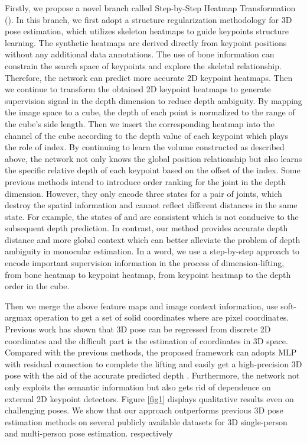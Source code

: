 \documentclass[letterpaper]{article} \usepackage{aaai21}  \usepackage{times}  \usepackage{helvet} \usepackage{courier}  \usepackage[hyphens]{url}  \usepackage{graphicx} \urlstyle{rm} \def\UrlFont{\rm}  \usepackage{natbib}  \usepackage{caption} \frenchspacing  \setlength{\pdfpagewidth}{8.5in}  \setlength{\pdfpageheight}{11in}
\begin{document}
Firstly, we propose a novel branch called Step-by-Step Heatmap Transformation (). In this branch, we first adopt a structure regularization methodology for 3D pose estimation, which utilizes skeleton heatmaps to guide keypoints structure learning. The synthetic heatmaps are derived directly from keypoint positions without any additional data annotations. The use of bone information can constrain the search space of keypoints and explore the skeletal relationship. Therefore, the network can predict more accurate 2D keypoint heatmaps. Then we continue to transform the obtained 2D keypoint heatmaps to generate supervision signal in the depth dimension to reduce depth ambiguity. By mapping the image space to a cube, the depth of each point is normalized to the range of the cube's side length. Then we insert the corresponding heatmap into the channel of the cube according to the depth value of each keypoint which plays the role of index. By continuing to learn the volume constructed as described above, the network not only knows the global position relationship but also learns the specific relative depth of each keypoint based on the offset of the index. Some previous methods intend to introduce order ranking for the joint in the depth dimension. However, they only encode three states  for a pair of joints, which destroy the spatial information and cannot reflect different distances in the same state. For example, the states of  and  are consistent which is not conducive to the subsequent depth prediction. In contrast, our method provides accurate depth distance and more global context which can better alleviate the problem of depth ambiguity in monocular estimation. In a word, we use a step-by-step approach to encode important supervision information in the process of dimension-lifting, from bone heatmap to keypoint heatmap, from keypoint heatmap to the depth order in the cube. 

Then we merge the above feature maps and image context information, use soft-argmax operation to get a set of solid  coordinates where  are pixel coordinates. Previous work has shown that 3D pose can be regressed from discrete 2D coordinates and the difficult part is the estimation of  coordinates in 3D space. Compared with the previous methods, the proposed framework can adopts MLP with residual connection to complete the lifting and easily get a high-precision 3D pose with the aid of the accurate predicted depth . Furthermore, the network not only exploits the semantic information but also gets rid of dependence on external 2D keypoint detectors. Figure \ref{fig1} displays qualitative results even on challenging poses. We show that our approach outperforms previous 3D pose estimation methods on several publicly available datasets for 3D single-person and multi-person pose estimation. 
respectively
\end{document}
